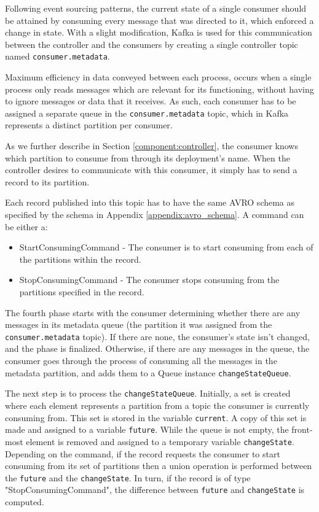 Following event sourcing patterns, the current state of a single consumer should
be attained by consuming every message that was directed to it, which enforced a
change in state. With a slight modification, Kafka is used for this
communication between the controller and the consumers by creating a single
controller topic named \lstinline[language=Python]{consumer.metadata}.

Maximum efficiency in data conveyed between each process, occurs when a single
process only reads messages which are relevant for its functioning, without
having to ignore messages or data that it receives. As such, each consumer has
to be assigned a separate queue in the
\lstinline[language=Python]{consumer.metadata} topic, which in Kafka represents
a distinct partition per consumer.

As we further describe in Section \ref{component:controller}, the consumer
knows which partition to consume from through its deployment's name. When the
controller desires to communicate with this consumer, it simply has to send a
record to its partition. 

Each record published into this topic has to have the same AVRO schema as
specified by the schema in Appendix \ref{appendix:avro_schema}. A command can be either
a: 
\begin{itemize} 
    \item StartConsumingCommand - The consumer is to start
        consuming from each of the partitions within the record.  
    \item StopConsumingCommand - The consumer stops consuming from the
        partitions specified in the record.  
\end{itemize}

The fourth phase starts with the consumer determining whether there are any
messages in its metadata queue (the partition it was assigned from the
\lstinline{consumer.metadata} topic). If there are none, the consumer's state
isn't changed, and the phase is finalized. Otherwise, if there are any messages
in the queue, the consumer goes through the process of consuming all the
messages in the metadata partition, and adds them to a Queue instance
\lstinline{changeStateQueue}.

The next step is to process the \lstinline{changeStateQueue}. Initially, a set
is created where each element represents a partition from a topic the consumer
is currently consuming from. This set is stored in the variable
\lstinline{current}. A copy of this set is made and assigned to a variable
\lstinline{future}. While the queue is not empty, the front-most element is
removed and assigned to a temporary variable \lstinline{changeState}. Depending
on the command, if the record requests the consumer to start consuming from its
set of partitions then a union operation is performed between the
\lstinline{future} and the \lstinline{changeState}. In turn, if the record is of
type "StopConsumingCommand", the difference between \lstinline{future} and
\lstinline{changeState} is computed.

